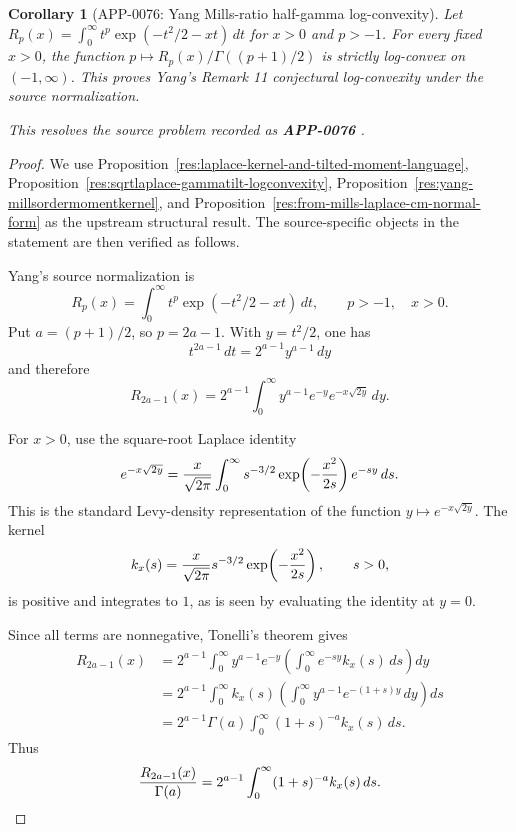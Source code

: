 \documentclass[11pt]{article}
\numberwithin{equation}{section}
\newtheorem{corollary}[theorem]{Corollary}
\theoremstyle{definition}
\theoremstyle{remark}
\newcommand{\1}{\mathbf 1}
\begin{document}
\begin{corollary}[APP-0076: Yang Mills-ratio half-gamma log-convexity]
\label{res:yang-millsratio-halfgamma-logconvexity}
Let \(R_p(x)=\int_0^\infty t^p\exp(-t^2/2-xt)\,dt\) for \(x>0\) and \(p>-1\). For every fixed \(x>0\), the function \(p\mapsto R_p(x)/\Gamma((p+1)/2)\) is strictly log-convex on \((-1,\infty)\). This proves Yang's Remark 11 conjectural log-convexity under the source normalization.



This resolves the source problem recorded as \textbf{APP-0076} \cite{app-app-0076-source}.
\end{corollary}

\begin{proof}
We use Proposition~\ref{res:laplace-kernel-and-tilted-moment-language}, Proposition~\ref{res:sqrtlaplace-gammatilt-logconvexity}, Proposition~\ref{res:yang-millsordermomentkernel}, and Proposition~\ref{res:from-mills-laplace-cm-normal-form} as the upstream structural result. The source-specific objects in the statement are then verified as follows.

Yang's source normalization is
\[
R_p(x)=\int_0^\infty t^p\exp(-t^2/2-xt)\,dt,\qquad p>-1,\quad x>0.
\]
Put \(a=(p+1)/2\), so \(p=2a-1\). With \(y=t^2/2\), one has
\[
t^{2a-1}\,dt=2^{a-1}y^{a-1}\,dy
\]
and therefore
\[
R_{2a-1}(x)
=2^{a-1}\int_0^\infty y^{a-1}e^{-y}e^{-x\sqrt{2y}}\,dy.
\]

For \(x>0\), use the square-root Laplace identity
\[
e^{-x\sqrt{2y}}
={x\over\sqrt{2\pi}}\int_0^\infty
s^{-3/2}\exp\!\left(-{x^2\over 2s}\right)e^{-sy}\,ds.
\]
This is the standard Levy-density representation of the function \(y\mapsto e^{-x\sqrt{2y}}\). The kernel
\[
k_x(s)={x\over\sqrt{2\pi}}s^{-3/2}\exp\!\left(-{x^2\over 2s}\right),\qquad s>0,
\]
is positive and integrates to \(1\), as is seen by evaluating the identity at \(y=0\).

Since all terms are nonnegative, Tonelli's theorem gives
\[
\begin{aligned}
R_{2a-1}(x)
&=2^{a-1}\int_0^\infty y^{a-1}e^{-y}
\left(\int_0^\infty e^{-sy}k_x(s)\,ds\right)dy \\
&=2^{a-1}\int_0^\infty k_x(s)
\left(\int_0^\infty y^{a-1}e^{-(1+s)y}\,dy\right)ds \\
&=2^{a-1}\Gamma(a)\int_0^\infty (1+s)^{-a}k_x(s)\,ds .
\end{aligned}
\]
Thus
\[
{R_{2a-1}(x)\over \Gamma(a)}
=2^{a-1}\int_0^\infty (1+s)^{-a}k_x(s)\,ds.
\]


\end{proof}
\end{document}
